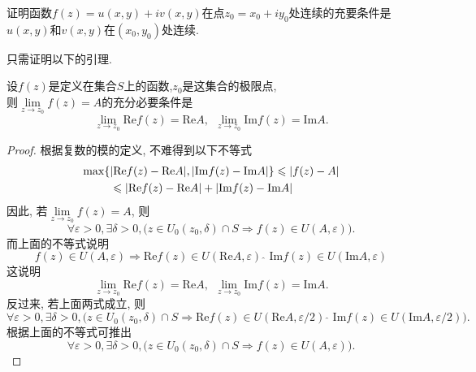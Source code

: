 \begin{yyEx}
	证明函数$f(z) = u(x,y) + iv(x,y)$在点$z_0 = x_0 + iy_0$处连续的充要条件是$u(x,y)$和$v(x,y)$在$(x_0,y_0)$处连续.
\end{yyEx}

\begin{yySolution}
	只需证明以下的引理.
	\begin{lemma}
		设$f(z)$是定义在集合$S$上的函数,$z_0$是这集合的极限点,\\ 则$\lim\limits_{z\to z_0}f(z) = A$的充分必要条件是
		\begin{equation*}
			\lim\limits_{z\to z_0}\mathrm{Re}f(z) = \mathrm{Re}A,~~\lim\limits_{z\to z_0}\mathrm{Im}f(z) = \mathrm{Im}A.
		\end{equation*}
	\end{lemma}
	\begin{proof}
		根据复数的模的定义, 不难得到以下不等式
		\begin{equation*}
			\begin{split}
				\max\{ &\lvert\mathrm{Re}f(z)-\mathrm{Re}A\rvert,\lvert\mathrm{Im}f(z)-\mathrm{Im}A\rvert \}\leqslant \lvert f(z)-A\rvert\\
				&\leqslant \lvert\mathrm{Re}f(z)-\mathrm{Re}A\rvert+\lvert\mathrm{Im}f(z)-\mathrm{Im}A\rvert
			\end{split}
		\end{equation*}
		因此, 若$\lim\limits_{z\to z_0}f(z) = A$, 则
		\begin{equation*}
			\forall\varepsilon>0,\exists\delta>0, \bigg(
			z\in U_0(z_0,\delta)\cap S\Rightarrow f(z)\in U(A,\varepsilon)
			\bigg).
		\end{equation*}
		而上面的不等式说明
		\begin{equation*}
			f(z)\in U(A,\varepsilon) \Rightarrow \mathrm{Re}f(z)\in U(\mathrm{Re}A,\varepsilon) ~\hat{~}~ \mathrm{Im}f(z)\in U(\mathrm{Im}A,\varepsilon)
		\end{equation*}
		这说明\begin{equation*}
		\lim\limits_{z\to z_0}\mathrm{Re}f(z) = \mathrm{Re}A,~~\lim\limits_{z\to z_0}\mathrm{Im}f(z) = \mathrm{Im}A.
		\end{equation*}
		反过来, 若上面两式成立, 则
		\begin{equation*}
		\forall\varepsilon>0,\exists\delta>0, \bigg(
		z\in U_0(z_0,\delta)\cap S\Rightarrow \mathrm{Re}f(z)\in U(\mathrm{Re}A,\varepsilon/2)~\hat{~}~\mathrm{Im}f(z)\in U(\mathrm{Im}A,\varepsilon/2)
		\bigg).
		\end{equation*}
		根据上面的不等式可推出
		\begin{equation*}
		\forall\varepsilon>0,\exists\delta>0, \bigg(
		z\in U_0(z_0,\delta)\cap S\Rightarrow f(z)\in U(A,\varepsilon)
		\bigg).
		\end{equation*}
	\end{proof}
\end{yySolution}

